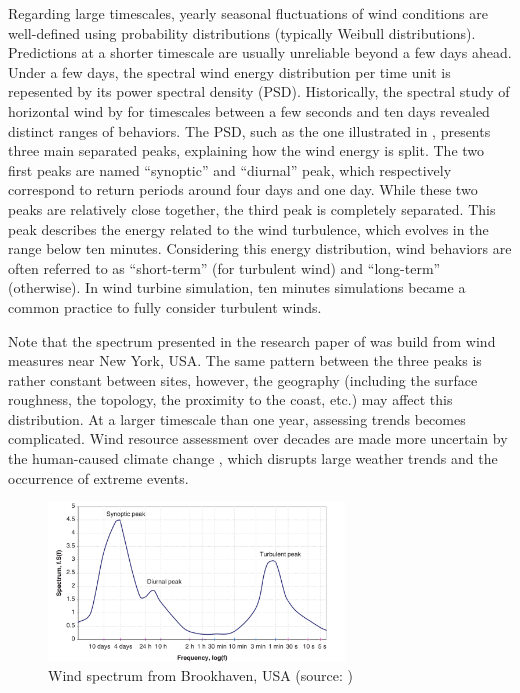 Regarding large timescales, yearly seasonal fluctuations of wind conditions are well-defined using probability distributions (typically Weibull distributions). 
Predictions at a shorter timescale are usually unreliable beyond a few days ahead. 
Under a few days, the spectral wind energy distribution per time unit is repesented by its power spectral density (PSD). 
Historically, the spectral study of horizontal wind by \citet{van_1957_wind_psd} for timescales between a few seconds and ten days revealed distinct ranges of behaviors. 
The PSD, such as the one illustrated in , presents three main separated peaks, explaining how the wind energy is split. 
The two first peaks are named ``synoptic'' and ``diurnal'' peak, which respectively correspond to return periods around four days and one day.
While these two peaks are relatively close together, the third peak is completely separated. 
This peak describes the energy related to the wind turbulence, which evolves in the range below ten minutes. 
Considering this energy distribution, wind behaviors are often referred to as ``short-term'' (for turbulent wind) and ``long-term'' (otherwise). 
In wind turbine simulation, ten minutes simulations became a common practice to fully consider turbulent winds. 

Note that the spectrum presented in the research paper of \citet{van_1957_wind_psd} was build from wind measures near New York, USA. 
The same pattern between the three peaks is rather constant between sites, however, the geography (including the surface roughness, the topology, the proximity to the coast, etc.) may affect this distribution. 
At a larger timescale than one year, assessing trends becomes complicated. 
Wind resource assessment over decades are made more uncertain by the human-caused climate change \cite{nagababu_2023_climate_change}, which disrupts large weather trends and the occurrence of extreme events. 

\begin{figure}
    \centering
    \includegraphics[width=0.7\textwidth]{./part1/figures/wind_spectrum.png}
    \caption{Wind spectrum from Brookhaven, USA (source: \citet{burton_2021_wind_handbook})}
    \label{fig:wind_psd}
\end{figure}


